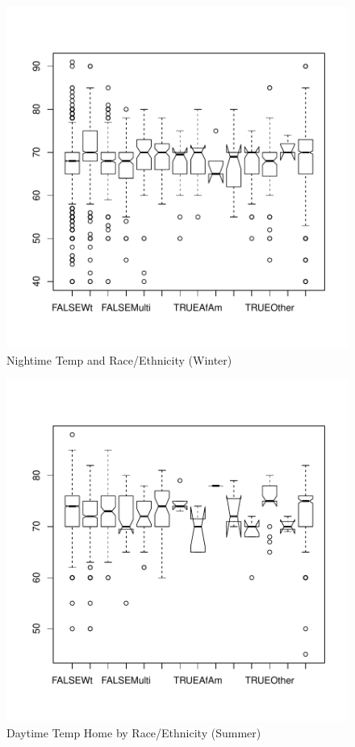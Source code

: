 \documentclass{article}
\begin{document}
\begin{figure}
\begin{center}
\caption{Nightime Temp and Race/Ethnicity (Winter)}
\label{fig:NightRace}
\includegraphics{DraftEdwardsWoods-017}
\end{center}
\end{figure}



\begin{figure}
\begin{center}
\caption{Daytime Temp Home by Race/Ethnicity (Summer)}
\label{fig:NightRaceS}
\includegraphics{DraftEdwardsWoods-018}
\end{center}
\end{figure}
\end{document}
